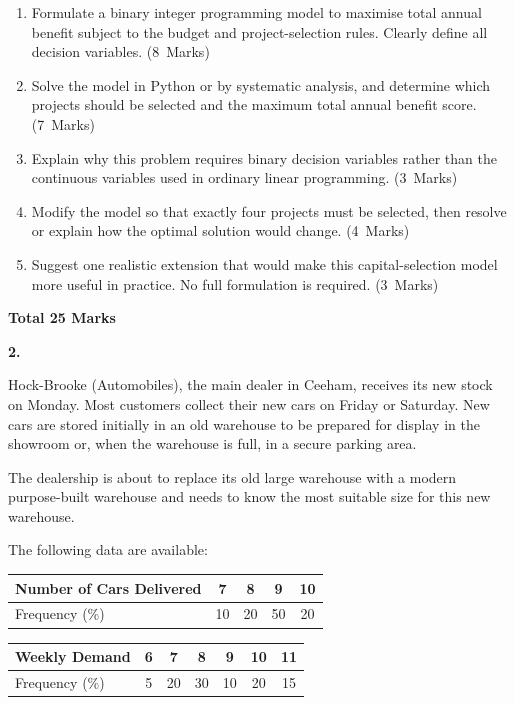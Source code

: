 \documentclass[11pt,a4paper]{article}
\newcommand{\markalloc}[1]{\nobreak\hfill\mbox{(#1 Marks)}}
\newcommand{\questiontotal}[1]{\begin{flushright}\textbf{Total #1 Marks}\end{flushright}}
\begin{document}
\begin{enumerate}
\item Formulate a binary integer programming model to maximise total annual benefit subject to the budget and project-selection rules. Clearly define all decision variables. \markalloc{8}

\item Solve the model in Python or by systematic analysis, and determine which projects should be selected and the maximum total annual benefit score. \markalloc{7}

\item Explain why this problem requires binary decision variables rather than the continuous variables used in ordinary linear programming. \markalloc{3}

\item Modify the model so that exactly four projects must be selected, then resolve or explain how the optimal solution would change. \markalloc{4}

\item Suggest one realistic extension that would make this capital-selection model more useful in practice. No full formulation is required. \markalloc{3}
\end{enumerate}

\questiontotal{25}

\newpage

\textbf{2.}

Hock-Brooke (Automobiles), the main dealer in Ceeham, receives its new stock on Monday.
Most customers collect their new cars on Friday or Saturday.
New cars are stored initially in an old warehouse to be prepared for display in the showroom or, when the warehouse is full, in a secure parking area.

The dealership is about to replace its old large warehouse with a modern purpose-built warehouse and needs to know the most suitable size for this new warehouse.

The following data are available:

\begin{center}
\begin{tabular}{lcccc}
\toprule
Number of Cars Delivered & 7 & 8 & 9 & 10 \\
\midrule
Frequency (\%) & 10 & 20 & 50 & 20 \\
\bottomrule
\end{tabular}
\end{center}

\begin{center}
\begin{tabular}{lcccccc}
\toprule
Weekly Demand & 6 & 7 & 8 & 9 & 10 & 11 \\
\midrule
Frequency (\%) & 5 & 20 & 30 & 10 & 20 & 15 \\
\bottomrule
\end{tabular}
\end{center}
\end{document}
